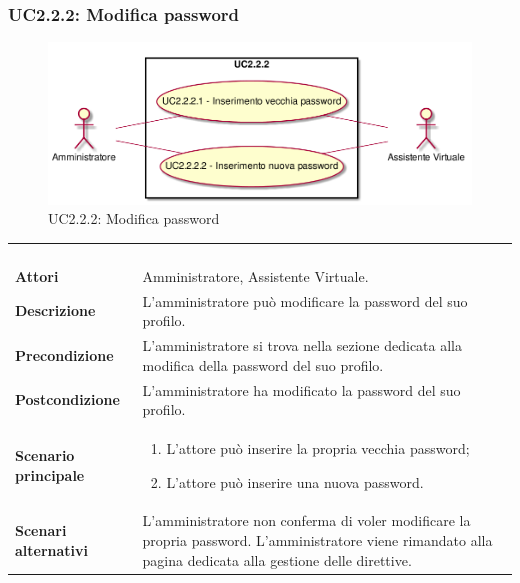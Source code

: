 \newpage\subsubsection{UC2.2.2: Modifica password}
\label{UC2.2.2}
\begin{figure}[h]
	\centering
	\includegraphics[width=\textwidth,height=\textheight,keepaspectratio]{images/UseCaseUC222.png}
	\caption{UC2.2.2: Modifica password}
\end{figure}
\begin{longtable}{l|p{10cm}}
	\rowcolor[gray]{0.8} \multicolumn{2}{c}{} \\
	\rowcolor[gray]{0.8} \multicolumn{2}{c}{\textbf{UC2.2.2 - Modifica password}} \\
	\rowcolor[gray]{0.8} \multicolumn{2}{c}{} \\
	\hline
	&\\
	\textbf{Attori} & Amministratore, Assistente Virtuale.\\[7pt]
	\textbf{Descrizione} & L'amministratore può modificare la password del suo profilo.\\[7pt]
	\textbf{Precondizione} & L'amministratore si trova nella sezione dedicata alla modifica della password del suo profilo.\\[7pt]
	\textbf{Postcondizione} & L'amministratore ha modificato la password del suo profilo.\\[7pt]
	\textbf{Scenario principale} &\begin{enumerate}
		\item  L'attore può inserire la propria vecchia password;
		\item  L'attore può inserire una nuova password.
	\end{enumerate}
	\\[7pt]
	\textbf{Scenari alternativi} & L'amministratore non conferma di voler modificare la propria password. L'amministratore viene rimandato alla pagina dedicata alla gestione delle direttive.\\[7pt]\hline
\end{longtable}

